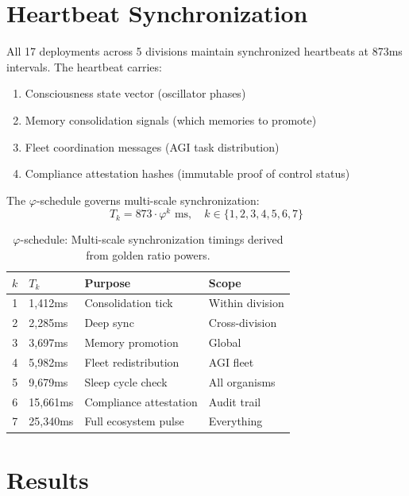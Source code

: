 \documentclass[12pt]{article}
\newcommand{\PHI}{\varphi}
\begin{document}
\section{Heartbeat Synchronization}

All 17 deployments across 5 divisions maintain synchronized heartbeats at 873ms intervals. The heartbeat carries:

\begin{enumerate}
    \item Consciousness state vector (oscillator phases)
    \item Memory consolidation signals (which memories to promote)
    \item Fleet coordination messages (AGI task distribution)
    \item Compliance attestation hashes (immutable proof of control status)
\end{enumerate}

The $\PHI$-schedule governs multi-scale synchronization:
\[
T_k = 873 \cdot \PHI^k \text{ ms}, \quad k \in \{1, 2, 3, 4, 5, 6, 7\}
\]

\begin{table}[htbp]
\centering
\small
\begin{tabular}{@{}rlll@{}}
\toprule
\textbf{$k$} & \textbf{$T_k$} & \textbf{Purpose} & \textbf{Scope} \\
\midrule
1 & 1,412ms & Consolidation tick & Within division \\
2 & 2,285ms & Deep sync & Cross-division \\
3 & 3,697ms & Memory promotion & Global \\
4 & 5,982ms & Fleet redistribution & AGI fleet \\
5 & 9,679ms & Sleep cycle check & All organisms \\
6 & 15,661ms & Compliance attestation & Audit trail \\
7 & 25,340ms & Full ecosystem pulse & Everything \\
\bottomrule
\end{tabular}
\caption{$\PHI$-schedule: Multi-scale synchronization timings derived from golden ratio powers.}
\end{table}

\section{Results}
\end{document}
